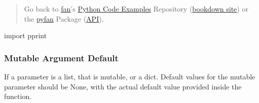\documentclass[
]{book}
\newenvironment{Shaded}{\begin{snugshade}}{\end{snugshade}}
\newcommand{\ImportTok}[1]{#1}
\newcommand{\NormalTok}[1]{#1}
\begin{document}
\begin{quote}
Go back to \href{http://fanwangecon.github.io/}{fan}'s \href{https://fanwangecon.github.io/Py4Econ/}{Python Code Examples} Repository (\href{https://fanwangecon.github.io/Py4Econ/bookdown}{bookdown site}) or the \href{https://pyfan.readthedocs.io/en/latest/}{pyfan} Package (\href{https://pyfan.readthedocs.io/en/latest/reference.html}{API}).
\end{quote}

\begin{Shaded}
\begin{Highlighting}[]
\ImportTok{import}\NormalTok{ pprint}
\end{Highlighting}
\end{Shaded}

\hypertarget{mutable-argument-default}{%
\subsubsection{Mutable Argument Default}\label{mutable-argument-default}}

If a parameter is a list, that is mutable, or a dict. Default values for the mutable parameter should be None, with the actual default value provided inside the function.
\end{document}
